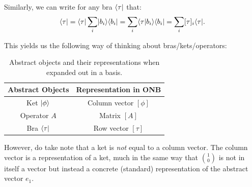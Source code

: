 Similarly, we can write for any bra $\langle \tau \rvert$ that:
\begin{equation}
    \langle \tau \rvert = \langle \tau \rvert\sum_i \lvert b_i \rangle \langle b_i \rvert = \sum_i \langle \tau \lvert b_i \rangle \langle b_i \rvert = \sum_i [\tau]_i\langle \tau \rvert.
\end{equation}

This yields us the following way of thinking about bras/kets/operators:

\begin{table}[htbp]
    \centering\begin{tabular}{|c|c|}
        \hline Abstract Objects & Representation in ONB 
        \\ \hline Ket $\ket{\phi}$ & Column vector $[\phi]$
        \\ Operator $A$ & Matrix $[A]$
        \\ Bra $\langle \tau \rvert$ & Row vector $[\tau]$
        \\ \hline
    \end{tabular}
    \caption{Abstract objects and their representations when expanded out in a basis.}
    \label{table-ketsascolvecs}
\end{table}

However, do take note that a ket is \emph{not} equal to a column vector. The column vector is a representation of a ket, much in the same way that $\binom{1}{0}$ is not in itself a vector but instead a concrete (standard) representation of the abstract vector $e_1$. 

